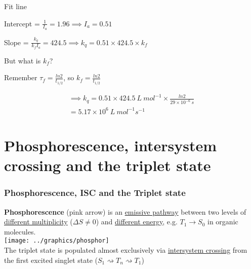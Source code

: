 \documentclass[a4paper,12pt,titlepage]{article}
\begin{document}
\begin{frame}[fragile]
\begin{example}
Fit line

Intercept = \(\frac{1}{I_a} = 1.96 \implies I_a=0.51\)

Slope = \(\frac{k_q}{k_fI_a} = 424.5 \implies k_q=0.51\times 424.5\times k_f\)

\medskip But what is \(k_f\)?
\end{example}
\end{frame}

\begin{frame}
\begin{example}
Remember \(\tau_f = \frac{ln2}{t_{1/2}}\), so \(k_f = \frac{ln2}{t_{1/2}}\)

\bigskip \begin{multline*}\implies k_q = 0.51 \times 424.5\ L\ mol^{-1} \times \frac{ln2}{29\times 10^{-6}\ s}\\=5.17\times 10^6\ L\ mol^{-1}s^{-1}\end{multline*}
\end{example}
\end{frame}

\section{Phosphorescence, intersystem crossing and the triplet state}
\begin{frame}
\frametitle{Phosphorescence, ISC and the Triplet state}
\textbf{Phosphorescence} (pink arrow) is an \underline{emissive pathway} between two levels of \underline{different multiplicity} (\(\Delta S \neq 0\)) and \underline{different energy}, e.g. \(T_1 \rightarrow S_0\) in organic molecules.\\
\texttt{[image: ../graphics/phosphor]}\\
The triplet state is populated almost exclusively via \underline{intersystem crossing} from the first excited singlet state  (\(S_1 \rightsquigarrow T_n \rightsquigarrow T_1\))
\end{frame}
\end{document}
